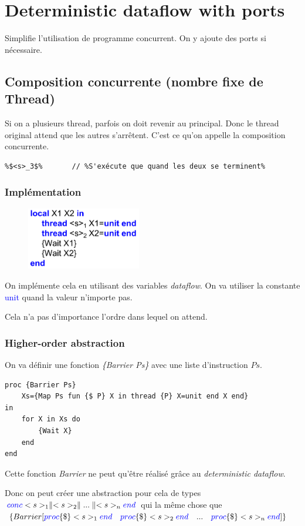 \documentclass{report}
\begin{document}
\section{Deterministic dataflow with ports}
Simplifie l'utilisation de programme concurrent. On y ajoute des ports si nécessaire.

\subsection{Composition concurrente (nombre fixe de Thread)}
Si on a plusieurs thread, parfois on doit revenir au principal. Donc le thread original attend que les autres s'arrêtent. C'est ce qu'on appelle la composition concurrente.
\begin{lstlisting}[escapechar=\%]
%$(<s>_1 \parallel <s>_2)$%	// %Crée deux threads et attends que les deux se terminent%
%$<s>_3$%		// %S'exécute que quand les deux se terminent%
\end{lstlisting}

\subsubsection{Implémentation}
\begin{figure}
\centering
\includegraphics[width=5cm]{img/deterministicDataflowUnit.png}
\end{figure}
On implémente cela en utilisant des variables \textit{dataflow}. On va utiliser la constante \textcolor{blue}{unit} quand la valeur n'importe pas.\par 
Cela n'a pas d'importance l'ordre dans lequel on attend.

\subsubsection{Higher-order abstraction}
On va définir une fonction \textit{\{Barrier Ps\}} avec une liste d'instruction $Ps$.
\begin{lstlisting}[escapechar=\%]
proc {Barrier Ps} 
	Xs={Map Ps fun {$ P} X in thread {P} X=unit end X end}
in 
	for X in Xs do 
		{Wait X} 
	end
end
\end{lstlisting}
Cette fonction \textit{Barrier} ne peut qu'être réalisé grâce au \textit{deterministic dataflow}.\par 
Donc on peut créer une abstraction pour cela de types $\textcolor{blue}{conc} <s>_1 \parallel <s>_2 \parallel ... \parallel <s>_n \textcolor{blue}{end}$ qui la même chose que $\{Barrier [\textcolor{blue}{proc} \{\$\} <s>_1 \textcolor{blue}{end} \quad \textcolor{blue}{proc} \{\$\} <s>_2 \textcolor{blue}{end} \quad ... \quad \textcolor{blue}{proc} \{\$\} <s>_n \textcolor{blue}{end} ]\}$
\end{document}
